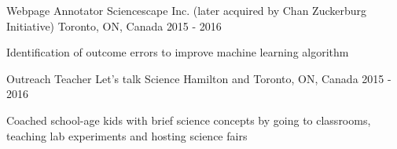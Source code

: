 


\begin{cventries}


\cventry
{Webpage Annotator} %
{Sciencescape Inc. (later acquired by Chan Zuckerburg Initiative)} %
{Toronto, ON, Canada} %
{2015 - 2016} %
{ %
\begin{cvitems}
\item {Identification of outcome errors to improve machine learning algorithm}
\end{cvitems}
}


\cventry
{Outreach Teacher} %
{Let's talk Science} %
{Hamilton and Toronto, ON, Canada} %
{2015 - 2016} %
{ %
\begin{cvitems}
\item {Coached school-age kids with brief science concepts by going to classrooms, teaching lab experiments and hosting science fairs}
\end{cvitems}
}


\end{cventries}